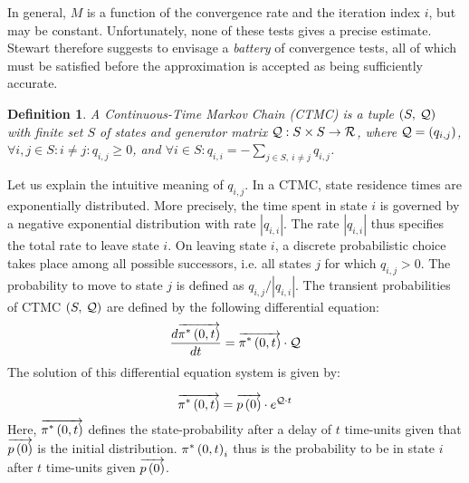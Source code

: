 \documentclass[times, 10pt,twocolumn]{article}
\newtheorem{definition}{Definition}
\begin{document}
		In general, $M$ is a function of the convergence rate and the iteration index $i$, but may be  constant.
		Unfortunately, none of these tests gives a precise estimate.  Stewart \cite{Stewart_94} therefore suggests to envisage a \emph{battery} of convergence tests, all of which must be satisfied before the approximation is accepted as being sufficiently accurate.

		
		\begin{definition}
			A Continuous-Time Markov Chain (\emph{CTMC}) is a tuple $\left( S,\: \mathcal{Q} \right)$ with finite set $S$ of states and generator matrix $\mathcal{Q} : S \times S \rightarrow \mathcal{R}$, where $\mathcal{Q}=\left(q_{i,j}\right)$, $\forall i,j \in S : i \neq j : q_{i,j} \geq 0$, and $\forall i \in S : q_{i,i} = - \sum_{j \in S, \: i \neq j} q_{i,j}$. 
		\end{definition}
		
		Let us explain the intuitive meaning of $q_{i,j}$.  In a CTMC, state residence times are exponentially distributed.  More precisely, the time spent in state $i$ is governed by a negative exponential distribution with rate $|q_{i,i}|$.  The rate $|q_{i,i}|$ thus specifies the total rate to leave state $i$.  On leaving state $i$, a discrete probabilistic choice takes place among all possible successors, i.e. all states $j$ for which $q_{i,j} > 0$.  The probability to move to state $j$ is defined as $q_{i,j} / |q_{i,i}|$.  The transient probabilities of CTMC $\left( S,\: \mathcal{Q} \right)$ are defined by the following differential equation:
		  \begin{equation}
			\frac{d \overrightarrow{\pi^{*} \left(0, t \right )}}{dt} = \overrightarrow{\pi^{*} \left(0, t \right )} \cdot \mathcal{Q} \nonumber
		  \end{equation}
		The solution of this differential equation system is given by:
		
		\begin{equation}
			\overrightarrow{\pi^{*} \left(0, t \right )} = \overrightarrow{p \left( 0 \right)} \cdot e^{\mathcal{Q}{\cdot}t}
			\label{eq:transient}
		\end{equation}
		Here, $\overrightarrow{\pi^{*} \left(0, t \right )}$ defines the state-probability after a delay of $t$ time-units given that  $\overrightarrow{p \left( 0 \right)}$ is the initial distribution.  $\pi^{*} \left(0, t \right )_{i}$ thus is the probability to be in state $i$ after $t$ time-units given $\overrightarrow{p \left( 0 \right)}$.
\end{document}
